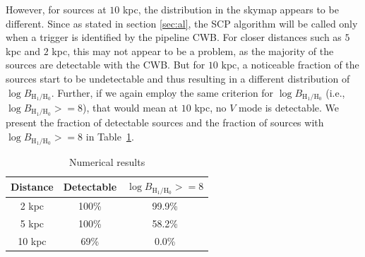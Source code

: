 \documentclass[aps,twocolumn,showpacs,groupedaddress, nofootinbib]{revtex4}  %
\begin{document}
However, for sources at $10$ kpc, the distribution in the skymap appears to be different.
Since as stated in section \ref{sec:al}, the \ac{SCP} algorithm will be called only when a trigger is identified by the pipeline \ac{CWB}.
For closer distances such as $5$ kpc and $2$ kpc, this may not appear to be a problem, as the majority of the sources are detectable with the \ac{CWB}.
But for $10$ kpc, a noticeable fraction of the sources start to be undetectable and thus resulting in a different distribution of $\log B_{\text{H}_1 / \text{H}_0}$. 
Further, if we again employ the same criterion for $\log B_{\text{H}_1 / \text{H}_0}$
(i.e., $\log B_{\text{H}_1 / \text{H}_0} >=8$), that would mean at $10$ kpc, no $V$ mode is detectable.
We present the fraction of detectable sources and the fraction of sources with $\log B_{\text{H}_1 / \text{H}_0} >=8$ in Table~\ref{table:nr}.
\begin{table}[]
\centering
\begin{threeparttable}
\caption{Numerical results}
\label{table:nr}
\def\arraystretch{2}%
\begin{tabular}{ccc}
\toprule
Distance  & Detectable & $\log B_{\text{H}_1 / \text{H}_0} >=8$ \\
\hline
2 kpc  & 100\%               & 99.9\%                    \\
5 kpc  & 100\%               & 58.2\%                    \\
10 kpc & 69\%                & 0.0\%                     \\
\hline
\hline
\end{tabular}
\begin{tablenotes}
\setlength{}
\end{tablenotes}
\end{threeparttable}
\end{table}
\end{document}
